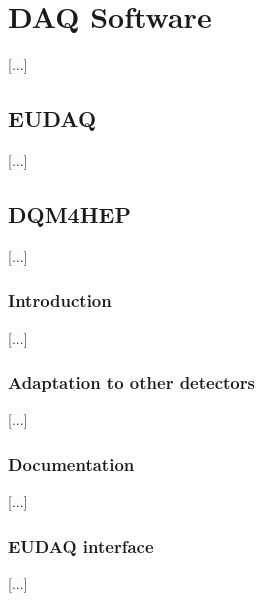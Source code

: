 \chapter{DAQ Software}
[...]

\section{EUDAQ}
[...]

\section{DQM4HEP}
[...]

\subsection{Introduction}
[...]

\subsection{Adaptation to other detectors}
[...]

\subsection{Documentation}
[...]

\subsection{EUDAQ interface}
[...]